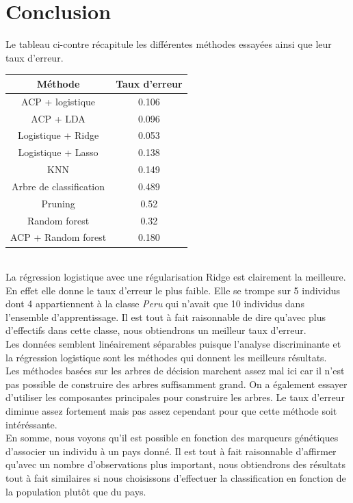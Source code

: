 \documentclass[12pt,a4paper]{article}
\begin{document}
\section{Conclusion}
Le tableau ci-contre récapitule les différentes méthodes essayées ainsi que leur taux d'erreur. \vspace{-4mm}
\begin{center}
	\begin{tabular}{|c|c|}
		\hline
		Méthode & Taux d'erreur \\ \hline
		ACP + logistique & 0.106 \\ \hline
		ACP + LDA & 0.096 \\ \hline
		Logistique + Ridge & 0.053 \\ \hline
		Logistique + Lasso & 0.138 \\ \hline
		KNN & 0.149 \\ \hline
		Arbre de classification & 0.489 \\ \hline
		Pruning & 0.52 \\ \hline
		Random forest & 0.32 \\ \hline
		ACP + Random forest & 0.180 \\ \hline
	\end{tabular}
	\label{tab:resume}
\end{center}
~\\
La régression logistique avec une régularisation Ridge est clairement la
meilleure. En effet elle donne le taux d'erreur le plus faible. Elle se trompe
sur 5 individus dont 4 appartiennent à la classe \textit{Peru} qui n'avait que
10 individus dans l'ensemble d'apprentissage. Il est tout à fait raisonnable de
dire qu'avec plus d'effectifs dans cette classe, nous obtiendrons un meilleur
taux d'erreur.\vspace{3mm}\\
Les données semblent linéairement séparables puisque l'analyse discriminante et
la régression logistique sont les méthodes qui donnent les meilleurs
résultats.\\
Les méthodes basées sur les arbres de décision marchent assez mal ici car il
n'est pas possible de construire des arbres suffisamment grand. On a
également essayer d'utiliser les composantes principales pour construire les
arbres. Le taux d'erreur diminue assez fortement mais pas assez cependant
pour que cette méthode soit intéréssante.\vspace{3mm}\\

En somme, nous voyons qu'il est possible en fonction des marqueurs génétiques
d'associer un individu à un pays donné. Il est tout à fait raisonnable
d'affirmer qu'avec un nombre d'observations plus important, nous obtiendrons
des résultats tout à fait similaires si nous choisissons d'effectuer la
classification en fonction de la population plutôt que du pays.
\end{document}

